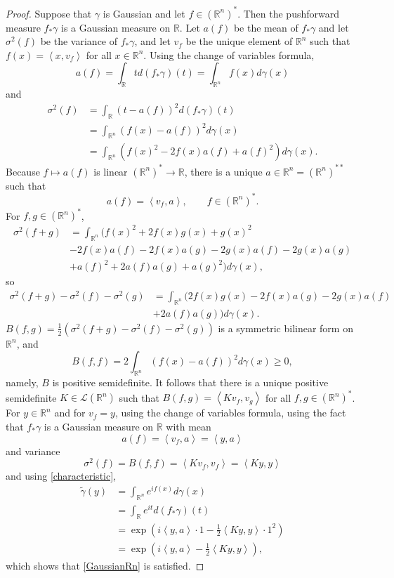 \documentclass{article}
\newcommand{\inner}[2]{\left\langle #1, #2 \right\rangle}
\theoremstyle{definition}
\theoremstyle{definition}
\begin{document}
\begin{proof}
Suppose that  $\gamma$ is Gaussian and let  $f \in (\mathbb{R}^n)^*$.  Then the pushforward
measure $f_* \gamma$ is a Gaussian measure on $\mathbb{R}$. Let
$a(f)$ be the mean of $f_* \gamma$ and let $\sigma^2(f)$ be the variance of $f_* \gamma$, and
 let $v_f$ be the unique element of $\mathbb{R}^n$ such that
$f(x) = \inner{x}{v_f}$ for all $x \in \mathbb{R}^n$. 
Using the change of variables formula,
\[
a(f) = \int_{\mathbb{R}} t d(f_* \gamma)(t) = 
\int_{\mathbb{R}^n} f(x) d\gamma(x)
\]
and
\begin{align*}
\sigma^2(f) &= \int_{\mathbb{R}} (t-a(f))^2 d(f_* \gamma)(t)\\
&=\int_{\mathbb{R}^n} (f(x)-a(f))^2 d\gamma(x)\\
&=\int_{\mathbb{R}^n} (f(x)^2-2f(x) a(f) + a(f)^2) d\gamma(x).
\end{align*}
Because $f \mapsto a(f)$ is linear $(\mathbb{R}^n)^* \to \mathbb{R}$, there is a unique
$a \in \mathbb{R}^n = (\mathbb{R}^n)^{**}$ such that
\[
a(f) = \inner{v_f}{a}, \qquad f \in (\mathbb{R}^n)^*.
\]
For $f,g \in (\mathbb{R}^n)^*$,
\begin{align*}
\sigma^2(f+g)&=\int_{\mathbb{R}^n} (f(x)^2+2f(x)g(x)+g(x)^2\\
&-2f(x)a(f)-2f(x)a(g)-2g(x)a(f)-2g(x)a(g) \\
&+a(f)^2+2a(f)a(g)+a(g)^2) d\gamma(x),
\end{align*}
so
\begin{align*}
\sigma^2(f+g)-\sigma^2(f)-\sigma^2(g)&=\int_{\mathbb{R}^n}  (2f(x)g(x)-2f(x)a(g)-2g(x)a(f)\\
&+2a(f)a(g)) d\gamma(x).
\end{align*}
 $B(f,g) = \frac{1}{2}(\sigma^2(f+g)-\sigma^2(f)-\sigma^2(g))$ is a symmetric bilinear form on $\mathbb{R}^n$, and
 \[
 B(f,f) = 2 \int_{\mathbb{R}^n} (f(x)-a(f))^2 d\gamma(x) \geq 0,
 \]
 namely, $B$ is positive semidefinite. It follows  that there is a unique positive semidefinite $K \in \mathscr{L}(\mathbb{R}^n)$ such that
 $B(f,g) = \inner{Kv_f}{v_g}$ for all $f,g \in (\mathbb{R}^n)^*$. 
 For $y \in \mathbb{R}^n$ and for $v_f=y$,  using the change of variables formula, using the fact that
 $f_* \gamma$ is a Gaussian measure on $\mathbb{R}$ with
 mean
\[
a(f) = \inner{v_f}{a} = \inner{y}{a}
\]
and variance
\[
\sigma^2(f) = B(f,f) = \inner{Kv_f}{v_f} = \inner{Ky}{y}
\]
 and  using \eqref{characteristic},
 \begin{align*}
 \widetilde{\gamma}(y)&=\int_{\mathbb{R}^n} e^{if(x)} d\gamma(x)\\
 &=\int_{\mathbb{R}} e^{it} d(f_*\gamma)(t)\\
 &=\exp\left(i\inner{y}{a}\cdot 1 - \frac{1}{2} \inner{Ky}{y}\cdot 1^2 \right)\\
 &=\exp\left(i\inner{y}{a}  - \frac{1}{2} \inner{Ky}{y} \right),
 \end{align*}
 which shows that \eqref{GaussianRn} is satisfied.
 

\end{proof}
\end{document}

